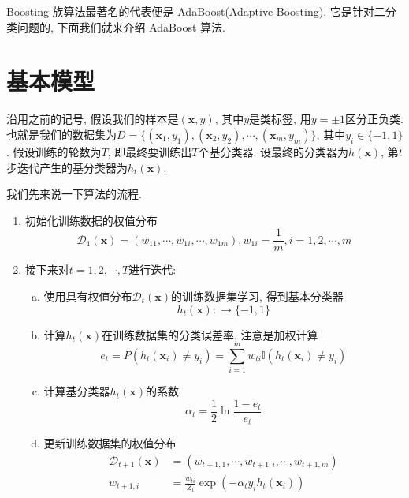 \documentclass[a4paper,UTF8]{ctexart}
\theoremstyle{plain} \newtheorem{theorem}{定理}[section]
\theoremstyle{plain} \newtheorem{definition}{定义}[section]
\theoremstyle{plain} \newtheorem{lemma}{引理}[section]
\theoremstyle{plain} \newtheorem{proposition}{命题}[section]
\theoremstyle{plain} \newtheorem{example}{例}[section]
\theoremstyle{plain} \newtheorem{remark}{注}[section]
\theoremstyle{plain} \newtheorem{corollary}{推论}[section]
\begin{document}
Boosting 族算法最著名的代表便是 AdaBoost(Adaptive Boosting), 它是针对二分类问题的, 下面我们就来介绍 AdaBoost 算法.






\section{基本模型}
沿用之前的记号, 假设我们的样本是$(\bm{x}, y)$, 其中$y$是类标签, 用$y = \pm 1$区分正负类. 也就是我们的数据集为$D = \{(\bm{x}_1, y_1), (\bm{x}_2, y_2), \cdots, (\bm{x}_m, y_m)\}$, 其中$y_i \in \{-1, 1\}$. 假设训练的轮数为$T$, 即最终要训练出$T$个基分类器. 设最终的分类器为$h(\bm{x})$, 第$t$步迭代产生的基分类器为$h_{t}(\bm{x})$.

我们先来说一下算法的流程.
\begin{enumerate}[(1)]
\item 初始化训练数据的权值分布
\begin{equation*}
\mathcal{D}_{1}(\bm{x}) = (w_{11}, \cdots, w_{1i}, \cdots, w_{1m}), w_{1i} = \frac{1}{m}, i = 1,2,\cdots,m
\end{equation*}

\item 接下来对$t = 1,2,\cdots,T$进行迭代:
\begin{enumerate}[(a)]
\item 使用具有权值分布$\mathcal{D}_{t}(\bm{x})$的训练数据集学习, 得到基本分类器
\begin{equation*}
h_{t}(\bm{x}): \rightarrow \{-1,1\}
\end{equation*}

\item 计算$h_{t}(\bm{x})$在训练数据集的分类误差率, 注意是加权计算
\begin{equation*}
e_{t} = P(h_{t}(\bm{x}_i) \neq y_i) = \sum_{i=1}^{m} w_{ti} \mathbb{I}(h_{t}(\bm{x}_i) \neq y_i)
\end{equation*}

\item 计算基分类器$h_{t}(\bm{x})$的系数
\begin{equation*}
\alpha_{t} = \frac{1}{2} \ln \frac{1 - e_t}{e_t}
\end{equation*}


\item 更新训练数据集的权值分布
\begin{align*}
\mathcal{D}_{t+1}(\bm{x}) & = (w_{t+1,1}, \cdots, w_{t+1,i}, \cdots, w_{t+1,m}) \\ 
w_{t+1,i} & = \frac{w_{ti}}{Z_t} \exp (- \alpha_{t} y_{i} h_{t}(\bm{x}_i))
\end{align*}


\end{enumerate}
\end{enumerate}
\end{document}
